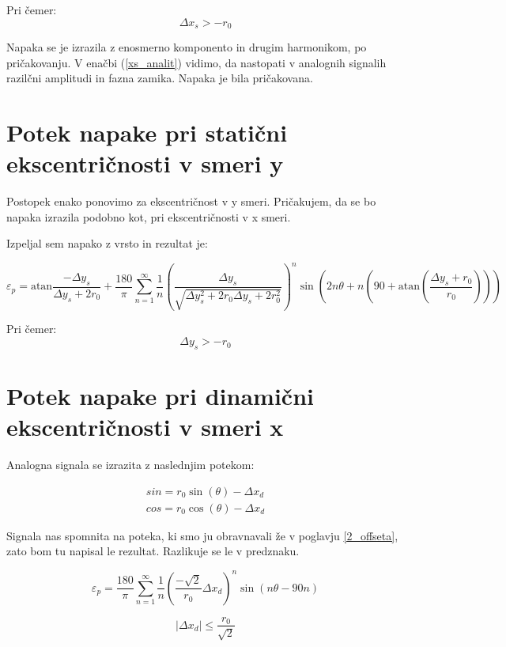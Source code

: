 Pri čemer:
 $$\Delta x_s > -r_0$$
 
 Napaka se je izrazila z enosmerno komponento in drugim harmonikom, po pričakovanju. V enačbi (\ref{xs_analit}) vidimo, da nastopati v analognih signalih razilčni amplitudi in fazna zamika. Napaka  je bila pričakovana.
 
 
 
 \section{Potek napake pri statični ekscentričnosti v smeri y}
 
 Postopek enako ponovimo za ekscentričnost v y smeri. Pričakujem, da se bo napaka izrazila podobno kot, pri ekscentričnosti v x smeri.
 
 Izpeljal sem napako z vrsto in rezultat je: 
 
  \begin{equation}
   \label{vrsta:ys}
 \varepsilon_p = \mathrm{atan}\frac{-\Delta y _s}{\Delta y _s+2r_0}+\frac{180}{\pi} \sum_{n=1}^{\infty}\frac{1}{n} (\frac{\Delta y _s}{\sqrt{\Delta y _s^2+2 r_0 \Delta y _s+2r_0^2}})^n \sin (2n \theta+n (90+ \mathrm{ atan}(\frac{\Delta y _s+r_0}{r_0})))
 \end{equation}

 Pri čemer:
$$\Delta y_s > -r_0$$

\section{Potek napake pri dinamični ekscentričnosti v smeri x}

Analogna signala se izrazita z naslednjim potekom:

\begin{eqnarray}
sin = r_0 \sin(\theta) - \Delta x_d \\
cos = r_0 \cos(\theta) - \Delta x_d
\end{eqnarray}

Signala nas spomnita na poteka, ki smo ju obravnavali že v poglavju \ref{2_offseta}, zato bom tu napisal le rezultat. Razlikuje se le v predznaku.

\begin{equation}
\label{vrsta_xd}
\varepsilon_p=
\frac{180}{\pi}\sum_{n=1}^{\infty}\frac{1}{n}( \frac{-\sqrt{2}}{r_0}\Delta x_d)^n \sin (n \theta -  90 n)
\end{equation}


$$|\Delta x_d|\leq \frac{r_0}{\sqrt{2}}$$


